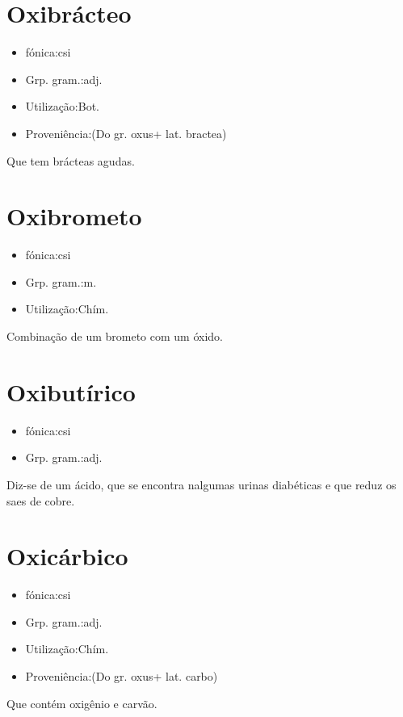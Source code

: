 \section{Oxibrácteo}
\begin{itemize}
\item {fónica:csi}
\end{itemize}
\begin{itemize}
\item {Grp. gram.:adj.}
\end{itemize}
\begin{itemize}
\item {Utilização:Bot.}
\end{itemize}
\begin{itemize}
\item {Proveniência:(Do gr. \textunderscore oxus\textunderscore  + lat. \textunderscore bractea\textunderscore )}
\end{itemize}
Que tem brácteas agudas.
\section{Oxibrometo}
\begin{itemize}
\item {fónica:csi}
\end{itemize}
\begin{itemize}
\item {Grp. gram.:m.}
\end{itemize}
\begin{itemize}
\item {Utilização:Chím.}
\end{itemize}
Combinação de um brometo com um óxido.
\section{Oxibutírico}
\begin{itemize}
\item {fónica:csi}
\end{itemize}
\begin{itemize}
\item {Grp. gram.:adj.}
\end{itemize}
Diz-se de um ácido, que se encontra nalgumas urinas diabéticas e que reduz os saes de cobre.
\section{Oxicárbico}
\begin{itemize}
\item {fónica:csi}
\end{itemize}
\begin{itemize}
\item {Grp. gram.:adj.}
\end{itemize}
\begin{itemize}
\item {Utilização:Chím.}
\end{itemize}
\begin{itemize}
\item {Proveniência:(Do gr. \textunderscore oxus\textunderscore  + lat. \textunderscore carbo\textunderscore )}
\end{itemize}
Que contém oxigênio e carvão.
